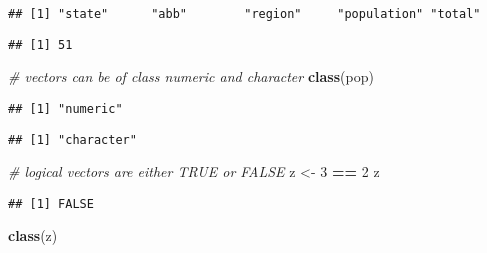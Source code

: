 \documentclass[
]{article}
\newenvironment{Shaded}{\begin{snugshade}}{\end{snugshade}}
\newcommand{\CommentTok}[1]{\textcolor[rgb]{0.56,0.35,0.01}{\textit{#1}}}
\newcommand{\DecValTok}[1]{\textcolor[rgb]{0.00,0.00,0.81}{#1}}
\newcommand{\KeywordTok}[1]{\textcolor[rgb]{0.13,0.29,0.53}{\textbf{#1}}}
\newcommand{\NormalTok}[1]{#1}
\newcommand{\OperatorTok}[1]{\textcolor[rgb]{0.81,0.36,0.00}{\textbf{#1}}}
\newcommand{\StringTok}[1]{\textcolor[rgb]{0.31,0.60,0.02}{#1}}
\begin{document}
\begin{verbatim}
## [1] "state"      "abb"        "region"     "population" "total"
\end{verbatim}

\begin{Shaded}
\end{Shaded}

\begin{verbatim}
## [1] 51
\end{verbatim}

\begin{Shaded}
\begin{Highlighting}[]
\CommentTok{# vectors can be of class numeric and character}
\KeywordTok{class}\NormalTok{(pop)}
\end{Highlighting}
\end{Shaded}

\begin{verbatim}
## [1] "numeric"
\end{verbatim}

\begin{Shaded}
\end{Shaded}

\begin{verbatim}
## [1] "character"
\end{verbatim}

\begin{Shaded}
\begin{Highlighting}[]
\CommentTok{# logical vectors are either TRUE or FALSE}
\NormalTok{z <-}\StringTok{ }\DecValTok{3} \OperatorTok{==}\StringTok{ }\DecValTok{2}
\NormalTok{z}
\end{Highlighting}
\end{Shaded}

\begin{verbatim}
## [1] FALSE
\end{verbatim}

\begin{Shaded}
\begin{Highlighting}[]
\KeywordTok{class}\NormalTok{(z)}
\end{Highlighting}
\end{Shaded}
\end{document}
